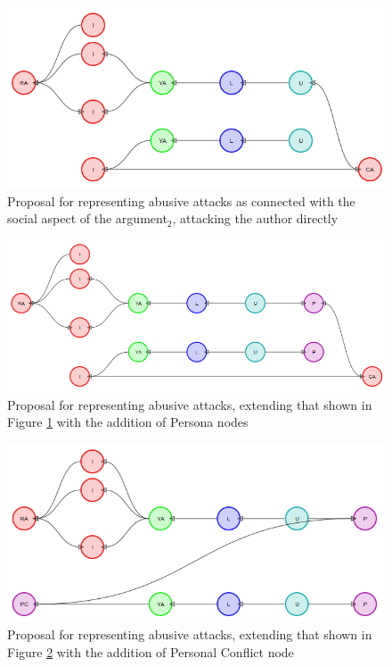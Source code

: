 \begin{figure}
\centering
\includegraphics[scale=\scaleProps]{./figures/cmna_proposals/abuse2.png}
\caption{Proposal for representing abusive attacks as connected with the social aspect of the argument$_2$, attacking the author directly}
\label{figure:cmna:abuse2}
\end{figure}

\begin{figure}
\centering
\includegraphics[scale=\scaleProps]{./figures/cmna_proposals/abuse3.png}
\caption{Proposal for representing abusive attacks, extending that shown in Figure \ref{figure:cmna:abuse2} with the addition of Persona nodes}
\label{figure:cmna:abuse3}
\end{figure}

\begin{figure}
\centering
\includegraphics[scale=0.5]{./figures/graphs/aswo-personal-conflict.png}
\caption{Proposal for representing abusive attacks, extending that shown in Figure \ref{figure:cmna:abuse3} with the addition of Personal Conflict node}
\label{figure:cmna:abuse4}
\end{figure}

